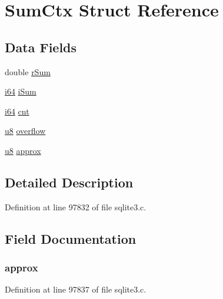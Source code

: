\hypertarget{struct_sum_ctx}{}\section{Sum\+Ctx Struct Reference}
\label{struct_sum_ctx}
\subsection*{Data Fields}
\begin{DoxyCompactItemize}
\item 
double \hyperlink{struct_sum_ctx_af82946520b4b13cac4fea7cd5c226437}{r\+Sum}
\item 
\hyperlink{sqlite3_8c_a2a0f0f4ae7001eb54351f77ea1cdbcfd}{i64} \hyperlink{struct_sum_ctx_af87622beff9f41a136efa9febaeb9ec3}{i\+Sum}
\item 
\hyperlink{sqlite3_8c_a2a0f0f4ae7001eb54351f77ea1cdbcfd}{i64} \hyperlink{struct_sum_ctx_a3b004a6d42cc249c0677509e4bac537a}{cnt}
\item 
\hyperlink{sqlite3_8c_a74a0f6424ae628af25f23f0a35f6ead3}{u8} \hyperlink{struct_sum_ctx_abb27716929bb243fa3d79c659124ff91}{overflow}
\item 
\hyperlink{sqlite3_8c_a74a0f6424ae628af25f23f0a35f6ead3}{u8} \hyperlink{struct_sum_ctx_a22aae4b1ccedcf4ccb68ff8c18445737}{approx}
\end{DoxyCompactItemize}


\subsection{Detailed Description}


Definition at line 97832 of file sqlite3.\+c.



\subsection{Field Documentation}
\hypertarget{struct_sum_ctx_a22aae4b1ccedcf4ccb68ff8c18445737}{}
\subsubsection[{approx}]{ approx}\label{struct_sum_ctx_a22aae4b1ccedcf4ccb68ff8c18445737}


Definition at line 97837 of file sqlite3.\+c.

